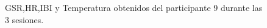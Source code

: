 \begin{figure}[h]
        \centering
        \caption{GSR,HR,IBI y Temperatura obtenidos del participante 9 durante las 3 sesiones.}\label{fig:data_p9}
\end{figure}
\pagebreak


